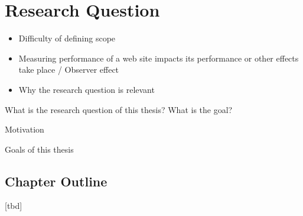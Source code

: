 \section{Research Question}

\begin{itemize}
\item Difficulty of defining scope
\item Measuring performance of a web site impacts its performance or other effects take place / Observer effect
\item Why the research question is relevant
\end{itemize}

What is the research question of this thesis?
What is the goal?







Motivation


Goals of this thesis


\subsection{Chapter Outline}
[tbd]


















